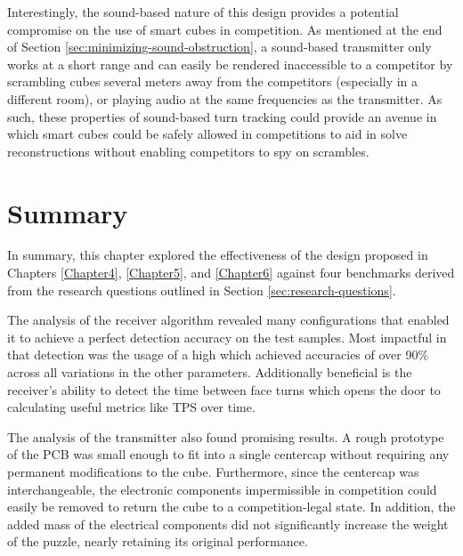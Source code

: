 Interestingly, the sound-based nature of this design provides a
potential compromise on the use of smart cubes in competition. As
mentioned at the end of Section \ref{sec:minimizing-sound-obstruction},
a sound-based transmitter only works at a short range and can easily be
rendered inaccessible to a competitor by scrambling cubes several
meters away from the competitors (especially in a different room), or
playing audio at the same frequencies as the transmitter. As such,
these properties of sound-based turn tracking could provide an avenue
in which smart cubes could be safely allowed in competitions to aid in
solve reconstructions without enabling competitors to spy on scrambles.

\section{Summary}

In summary, this chapter explored the effectiveness of the design
proposed in Chapters \ref{Chapter4}, \ref{Chapter5}, and \ref{Chapter6}
against four benchmarks derived from the research questions outlined in
Section \ref{sec:research-questions}.

The analysis of the receiver algorithm revealed many configurations
that enabled it to achieve a perfect detection accuracy on the test
samples. Most impactful in that detection was the usage of a high
 which achieved accuracies of over 90\% across all
variations in the other parameters. Additionally beneficial is the
receiver's ability to detect the time between face turns which opens
the door to calculating useful metrics like TPS over time.

The analysis of the transmitter also found promising results. A rough
prototype of the PCB was small enough to fit into a single centercap
without requiring any permanent modifications to the cube. Furthermore,
since the centercap was interchangeable, the electronic components
impermissible in competition could easily be removed to return the cube
to a competition-legal state. In addition, the added mass of the
electrical components did not significantly increase the weight of the
puzzle, nearly retaining its original performance.
